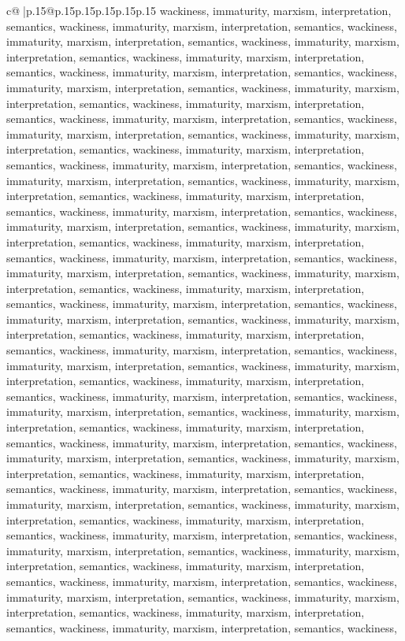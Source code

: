 \documentclass{article}
\begin{document}
{\begin{supertabular}{c@{$\;$}|p{.15\linewidth}@{}p{.15\linewidth}p{.15\linewidth}p{.15\linewidth}p{.15\linewidth}p{.15\linewidth}}
{{{wackiness, immaturity, marxism, interpretation, semantics, wackiness, immaturity, marxism, interpretation, semantics, wackiness, immaturity, marxism, interpretation, semantics, wackiness, immaturity, marxism, interpretation, semantics, wackiness, immaturity, marxism, interpretation, semantics, wackiness, immaturity, marxism, interpretation, semantics, wackiness, immaturity, marxism, interpretation, semantics, wackiness, immaturity, marxism, interpretation, semantics, wackiness, immaturity, marxism, interpretation, semantics, wackiness, immaturity, marxism, interpretation, semantics, wackiness, immaturity, marxism, interpretation, semantics, wackiness, immaturity, marxism, interpretation, semantics, wackiness, immaturity, marxism, interpretation, semantics, wackiness, immaturity, marxism, interpretation, semantics, wackiness, immaturity, marxism, interpretation, semantics, wackiness, immaturity, marxism, interpretation, semantics, wackiness, immaturity, marxism, interpretation, semantics, wackiness, immaturity, marxism, interpretation, semantics, wackiness, immaturity, marxism, interpretation, semantics, wackiness, immaturity, marxism, interpretation, semantics, wackiness, immaturity, marxism, interpretation, semantics, wackiness, immaturity, marxism, interpretation, semantics, wackiness, immaturity, marxism, interpretation, semantics, wackiness, immaturity, marxism, interpretation, semantics, wackiness, immaturity, marxism, interpretation, semantics, wackiness, immaturity, marxism, interpretation, semantics, wackiness, immaturity, marxism, interpretation, semantics, wackiness, immaturity, marxism, interpretation, semantics, wackiness, immaturity, marxism, interpretation, semantics, wackiness, immaturity, marxism, interpretation, semantics, wackiness, immaturity, marxism, interpretation, semantics, wackiness, immaturity, marxism, interpretation, semantics, wackiness, immaturity, marxism, interpretation, semantics, wackiness, immaturity, marxism, interpretation, semantics, wackiness, immaturity, marxism, interpretation, semantics, wackiness, immaturity, marxism, interpretation, semantics, wackiness, immaturity, marxism, interpretation, semantics, wackiness, immaturity, marxism, interpretation, semantics, wackiness, immaturity, marxism, interpretation, semantics, wackiness, immaturity, marxism, interpretation, semantics, wackiness, immaturity, marxism, interpretation, semantics, wackiness, immaturity, marxism, interpretation, semantics, wackiness, immaturity, marxism, interpretation, semantics, wackiness, immaturity, marxism, interpretation, semantics, wackiness, immaturity, marxism, interpretation, semantics, wackiness, immaturity, marxism, interpretation, semantics, wackiness, immaturity, marxism, interpretation, semantics, wackiness, immaturity, marxism, interpretation, semantics, wackiness, immaturity, marxism, interpretation, semantics, wackiness, immaturity, marxism, interpretation, semantics, wackiness, immaturity, marxism, interpretation, semantics, wackiness, immaturity, marxism, interpretation, semantics, wackiness, immaturity, marxism, interpretation, semantics, wackiness, immaturity, marxism, interpretation, semantics, wackiness, }}}
\end{supertabular}}
\end{document}
